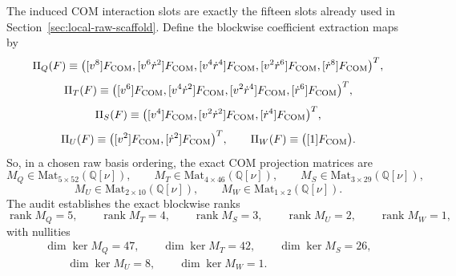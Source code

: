 \documentclass[11pt]{article}
\begin{document}
The induced COM interaction slots are exactly the fifteen slots already used in
Section~\ref{sec:local-raw-scaffold}.  Define the blockwise coefficient
extraction maps by
\begin{equation}
\Pi_Q(F)
\equiv
\bigl(
[v^8]F_{\rm COM},
[v^6\dot r^2]F_{\rm COM},
[v^4\dot r^4]F_{\rm COM},
[v^2\dot r^6]F_{\rm COM},
[\dot r^8]F_{\rm COM}
\bigr)^T,
\label{eq:app-4pn-local-scaffold-PiQ}
\end{equation}
\begin{equation}
\Pi_T(F)
\equiv
\bigl(
[v^6]F_{\rm COM},
[v^4\dot r^2]F_{\rm COM},
[v^2\dot r^4]F_{\rm COM},
[\dot r^6]F_{\rm COM}
\bigr)^T,
\label{eq:app-4pn-local-scaffold-PiT}
\end{equation}
\begin{equation}
\Pi_S(F)
\equiv
\bigl(
[v^4]F_{\rm COM},
[v^2\dot r^2]F_{\rm COM},
[\dot r^4]F_{\rm COM}
\bigr)^T,
\label{eq:app-4pn-local-scaffold-PiS}
\end{equation}
\begin{equation}
\Pi_U(F)
\equiv
\bigl(
[v^2]F_{\rm COM},
[\dot r^2]F_{\rm COM}
\bigr)^T,
\qquad
\Pi_W(F)
\equiv
\bigl([1]F_{\rm COM}\bigr).
\label{eq:app-4pn-local-scaffold-PiUW}
\end{equation}
So, in a chosen raw basis ordering, the exact COM projection matrices are
\begin{equation}
M_Q\in\mathrm{Mat}_{5\times 52}(\mathbb Q[\nu]),
\qquad
M_T\in\mathrm{Mat}_{4\times 46}(\mathbb Q[\nu]),
\qquad
M_S\in\mathrm{Mat}_{3\times 29}(\mathbb Q[\nu]),
\label{eq:app-4pn-local-scaffold-proj-mats-a}
\end{equation}
\begin{equation}
M_U\in\mathrm{Mat}_{2\times 10}(\mathbb Q[\nu]),
\qquad
M_W\in\mathrm{Mat}_{1\times 2}(\mathbb Q[\nu]).
\label{eq:app-4pn-local-scaffold-proj-mats-b}
\end{equation}
The audit establishes the exact blockwise ranks
\begin{equation}
\operatorname{rank}M_Q=5,
\qquad
\operatorname{rank}M_T=4,
\qquad
\operatorname{rank}M_S=3,
\qquad
\operatorname{rank}M_U=2,
\qquad
\operatorname{rank}M_W=1,
\label{eq:app-4pn-local-scaffold-ranks}
\end{equation}
with nullities
\begin{equation}
\begin{aligned}
\dim\ker M_Q=47,
\qquad
\dim\ker M_T=42,
\qquad
\dim\ker M_S=26,
\\
\qquad
\dim\ker M_U=8,
\qquad
\dim\ker M_W=1.
\end{aligned}
\label{eq:app-4pn-local-scaffold-nullities}
\end{equation}
\end{document}
